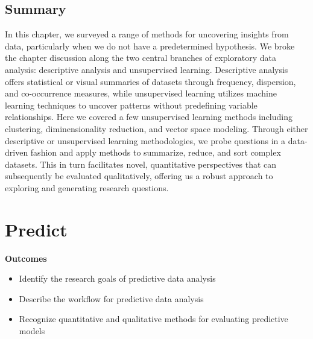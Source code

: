 \documentclass[
  letterpaper,
]{book}
\providecommand{\tightlist}{%
  \setlength{\itemsep}{0pt}\setlength{\parskip}{0pt}}\usepackage{longtable,booktabs,array}
\theoremstyle{definition}
\theoremstyle{remark}
\begin{document}
\section*{Summary}\label{summary-7}


In this chapter, we surveyed a range of methods for uncovering insights
from data, particularly when we do not have a predetermined hypothesis.
We broke the chapter discussion along the two central branches of
exploratory data analysis: descriptive analysis and unsupervised
learning. Descriptive analysis offers statistical or visual summaries of
datasets through frequency, dispersion, and co-occurrence measures,
while unsupervised learning utilizes machine learning techniques to
uncover patterns without predefining variable relationships. Here we
covered a few unsupervised learning methods including clustering,
diminensionality reduction, and vector space modeling. Through either
descriptive or unsupervised learning methodologies, we probe questions
in a data-driven fashion and apply methods to summarize, reduce, and
sort complex datasets. This in turn facilitates novel, quantitative
perspectives that can subsequently be evaluated qualitatively, offering
us a robust approach to exploring and generating research questions.

\chapter{Predict}\label{sec-predict-chapter}

\begin{tcolorbox}[enhanced jigsaw, breakable, colframe=quarto-callout-color-frame, toprule=.15mm, arc=.35mm, colback=white, left=2mm, bottomrule=.15mm, rightrule=.15mm, opacityback=0, leftrule=.75mm]

\textbf{ Outcomes}

\begin{itemize}
\tightlist
\item
  Identify the research goals of predictive data analysis
\item
  Describe the workflow for predictive data analysis
\item
  Recognize quantitative and qualitative methods for evaluating
  predictive models
\end{itemize}

\end{tcolorbox}
\end{document}

